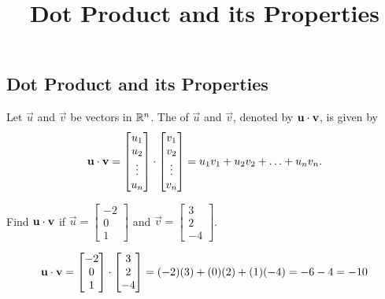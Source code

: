 \documentclass{ximera}
\title{Dot Product and its Properties} \license{CC BY-NC-SA 4.0}
\begin{document}
\begin{abstract}
 \end{abstract}
\maketitle

\begin{onlineOnly}
\section*{Dot Product and its Properties}
\end{onlineOnly}

\begin{definition}\label{def:dotproduct}
  Let $\vec{u}$ and $\vec{v}$ be vectors in $\mathbb{R}^n$.  The  of $\vec{u}$ and $\vec{v}$, denoted by
  $\mathbf{u}\cdot \mathbf{v}$, is given by
  \begin{align*}
    \mathbf{u}\cdot\mathbf{v}=\begin{bmatrix}u_1\\u_2\\\vdots\\u_n\end{bmatrix}\cdot\begin{bmatrix}v_1\\v_2\\\vdots\\v_n\end{bmatrix}=u_1v_1+u_2v_2+\ldots+u_nv_n.
  \end{align*}
\end{definition}

\begin{example}\label{ex:dotex}
  Find $\mathbf{u}\cdot \mathbf{v}$ if
  $\vec{u}=\begin{bmatrix}-2\\0\\1\end{bmatrix}$ and
  $\vec{v}=\begin{bmatrix}3\\2\\-4\end{bmatrix}$.

  \begin{explanation}
    $$\mathbf{u}\cdot\mathbf{v}=\begin{bmatrix}-2\\0\\1\end{bmatrix}\cdot\begin{bmatrix}3\\2\\-4\end{bmatrix}=(-2)(3)+(0)(2)+(1)(-4)=-6-4=-10$$
  \end{explanation}
\end{example}
\end{document}
